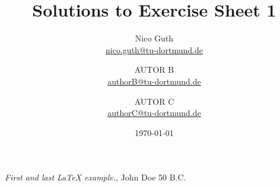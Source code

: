 \documentclass{scrartcl}
\title{Solutions to Exercise Sheet 1}
\author{
    Nico Guth  \\
    \href{mailto:nico.guth@tu-dortmund.de}{nico.guth@tu-dortmund.de}
	\and
	AUTOR B\\
    \href{mailto:authorB@tu-dortmund.de}{authorB@tu-dortmund.de}
	\and
	AUTOR C\\
    \href{mailto:authorC@tu-dortmund.de}{authorC@tu-dortmund.de}
	}
\date{\today}
\begin{document}
\maketitle





\begin{thebibliography}{9}
 \emph{First and last \LaTeX{} example.},
John Doe 50 B.C. 
\end{thebibliography}
\end{document}
